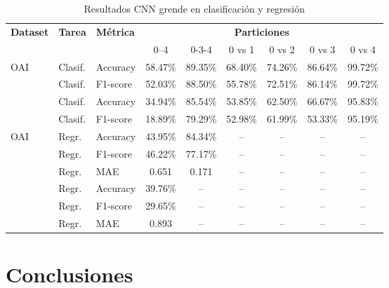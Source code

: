 \documentclass[11pt,spanish,listoffigures,listoftables]{tfgetsinf}
\begin{document}
\begin{table}[h]
    \centering
    \caption{Resultados CNN grende en clasificación y regresión}
    \label{tab:cnn_grande_results}
    \begin{tabular}{@{} l l l c c c c c c @{}} 
      \toprule
      \textbf{Dataset} & \textbf{Tarea} & \textbf{Métrica} 
        & \multicolumn{6}{c}{\textbf{Particiones}} \\
      \cmidrule(lr){4-9}
      & & & 0--4 & 0-3-4 & 0 vs 1 & 0 vs 2 & 0 vs 3 & 0 vs 4 \\
      \midrule
      \multirow{2}{*}{OAI}
        & Clasif. & Accuracy   & 58.47\% & 89.35\% & 68.40\% & 74.26\% & 86.64\% & 99.72\% \\
        & Clasif. & F1-score   & 52.03\% & 88.50\% & 55.78\% & 72.51\% & 86.14\% & 99.72\% \\
      \addlinespace
      \multirow{2}{*}{Gatos}
        & Clasif. & Accuracy   & 34.94\% & 85.54\% & 53.85\% & 62.50\% & 66.67\% & 95.83\% \\
        & Clasif. & F1-score   & 18.89\% & 79.29\% & 52.98\% & 61.99\% & 53.33\% & 95.19\% \\
      \midrule
      \multirow{3}{*}{OAI}
        & Regr.   & Accuracy   & 43.95\% & 84.34\% & -- & -- & -- & -- \\
        & Regr.   & F1-score   & 46.22\% & 77.17\% & -- & -- & -- & -- \\
        & Regr.   & MAE        & 0.651 & 0.171 & -- & -- & -- & -- \\
      \addlinespace
      \multirow{3}{*}{Gatos}
        & Regr.   & Accuracy   & 39.76\% & -- & -- & -- & -- & -- \\
        & Regr.   & F1-score   & 29.65\% & -- & -- & -- & -- & -- \\
        & Regr.   & MAE        & 0.893 & -- & -- & -- & -- & -- \\
      \bottomrule
    \end{tabular}
\end{table}




  
\section{Conclusiones}

\end{document}
